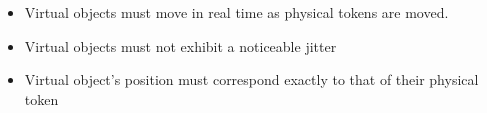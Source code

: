 \begin{itemize}

						\item Virtual objects must move in real time as physical tokens are moved.
						\item Virtual objects must not exhibit a noticeable jitter
						\item Virtual object's position must correspond exactly to that of their physical token
					\end{itemize}
			